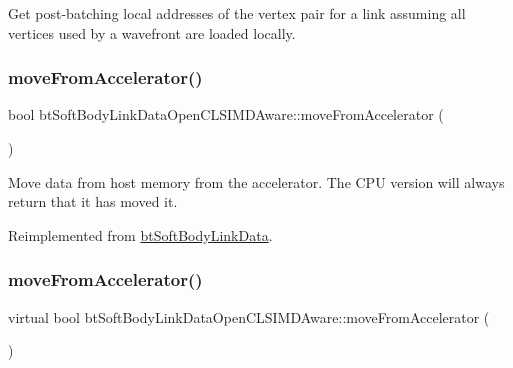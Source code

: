 Get post-\/batching local addresses of the vertex pair for a link assuming all vertices used by a wavefront are loaded locally. \mbox{\label{classbtSoftBodyLinkDataOpenCLSIMDAware_a9eed0794cbaa4b7f0c8dd1fc5570c15f}} 
\subsubsection{\texorpdfstring{move\+From\+Accelerator()}{moveFromAccelerator()}\hspace{0.1cm}{\footnotesize\ttfamily [1/2]}}
{\footnotesize\ttfamily bool bt\+Soft\+Body\+Link\+Data\+Open\+C\+L\+S\+I\+M\+D\+Aware\+::move\+From\+Accelerator (\begin{DoxyParamCaption}{ }\end{DoxyParamCaption})\hspace{0.3cm}{\ttfamily [virtual]}}

Move data from host memory from the accelerator. The C\+PU version will always return that it has moved it. 

Reimplemented from \hyperlink{classbtSoftBodyLinkData_a5018ad236aae590df94bca63c1ad7ee1}{bt\+Soft\+Body\+Link\+Data}.

\mbox{\label{classbtSoftBodyLinkDataOpenCLSIMDAware_a5ae3174b36d5ee2c13c96ddf775785b8}} 
\subsubsection{\texorpdfstring{move\+From\+Accelerator()}{moveFromAccelerator()}\hspace{0.1cm}{\footnotesize\ttfamily [2/2]}}
{\footnotesize\ttfamily virtual bool bt\+Soft\+Body\+Link\+Data\+Open\+C\+L\+S\+I\+M\+D\+Aware\+::move\+From\+Accelerator (\begin{DoxyParamCaption}{ }\end{DoxyParamCaption})\hspace{0.3cm}{\ttfamily [virtual]}}

